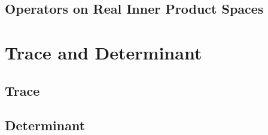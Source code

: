 \documentclass[11pt, letterpaper]{article}
\begin{document}
\newpage
\subsection{Operators on Real Inner Product Spaces}

\newpage
\section{Trace and Determinant}
\subsection{Trace}

\newpage
\subsection{Determinant}
\end{document}
